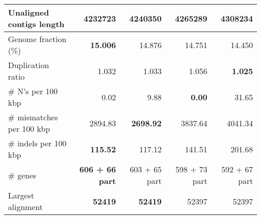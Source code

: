 \documentclass[12pt,a4paper]{article}
\begin{document}
\begin{table}[ht]
\begin{center}
\begin{tabular}{|l*{4}{|r}|}
Unaligned contigs length & {\bf 4232723} & 4240350 & 4265289 & 4308234 \\ \hline
Genome fraction (\%) & {\bf 15.006} & 14.876 & 14.751 & 14.450 \\ \hline
Duplication ratio & 1.032 & 1.033 & 1.056 & {\bf 1.025} \\ \hline
\# N's per 100 kbp & 0.02 & 9.88 & {\bf 0.00} & 31.65 \\ \hline
\# mismatches per 100 kbp & 2894.83 & {\bf 2698.92} & 3837.64 & 4041.34 \\ \hline
\# indels per 100 kbp & {\bf 115.52} & 117.12 & 141.51 & 201.68 \\ \hline
\# genes & {\bf 606 + 66 part} & 603 + 65 part & 598 + 73 part & 592 + 67 part \\ \hline
Largest alignment & {\bf 52419} & {\bf 52419} & 52397 & 52397 \\ \hline
\end{tabular}
\end{center}
\end{table}
\end{document}
